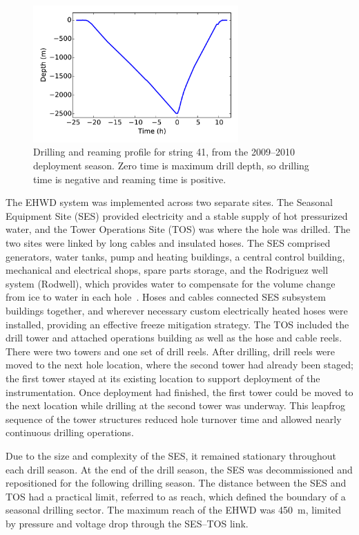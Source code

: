 \begin{figure}[!ht]
 \centering
 \includegraphics[width=0.7\textwidth]{graphics/drill/drill_depth_hole41.pdf}
\caption{Drilling and reaming profile for string 41, from the 2009--2010
  deployment season. Zero time is maximum drill depth, so drilling time is
  negative and reaming time is positive.}
\label{fig:drilldepthtime}
\end{figure}

The EHWD system was implemented across two separate sites. The Seasonal
Equipment Site (SES) provided electricity and a stable supply of hot
pressurized water, and the Tower Operations Site (TOS) was where the hole
was drilled.  The two sites were linked by long cables and insulated
hoses. The SES comprised generators, water tanks, pump and heating
buildings, a central control building, mechanical and electrical shops,
spare parts storage, and the Rodriguez well system (Rodwell), which
provides water to compensate for the volume change from ice to water
in each hole~\cite{rodriguez_well}. Hoses and cables connected SES subsystem buildings together, and
wherever necessary custom electrically heated hoses were installed,
providing an effective freeze mitigation strategy. The TOS included the
drill tower and attached operations building as well as the hose and cable
reels.  There were two towers and one set of drill reels.  After drilling,
drill reels were moved to the next hole location, where the second tower
had already been staged; the first tower stayed at its existing location
to support deployment of the instrumentation.  Once deployment had
finished, the first tower could be moved to the next location while
drilling at the second tower was underway.  This leapfrog sequence of the
tower structures reduced hole turnover time and allowed nearly
continuous drilling operations.

Due to the size and complexity of the SES, it remained stationary
throughout each drill season.  At the end of the drill season, the SES was
decommissioned and repositioned for the following drilling season.  The
distance between the SES and TOS had a practical limit, referred to as
reach, which defined the boundary of a seasonal drilling sector.  The
maximum reach
of the EHWD was 450~m, limited by pressure and voltage drop through the
SES--TOS link.

